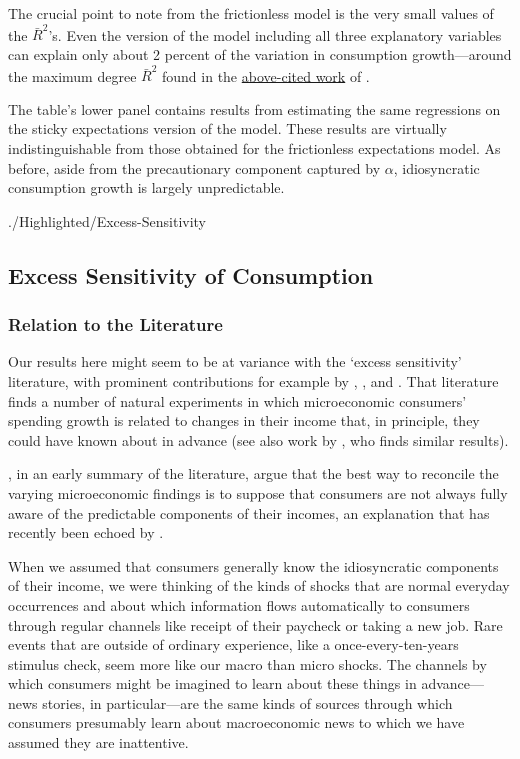 \documentclass[titlepage]{./econtex}
\begin{document}
The crucial point to note from the frictionless model is the very small values of the $\bar{R}^{2}$'s.  Even the version of the model including all three explanatory variables can explain only about 2 percent of the variation in consumption growth---around the maximum degree $\bar{R}^{2}$ found in the \hyperlink{dynanR2}{above-cited work} of \cite{dynanHabits}.

The table's lower panel contains results from estimating the same regressions on the sticky expectations version of the model.  These results are virtually indistinguishable from those obtained for the frictionless expectations model.  As before, aside from the precautionary component captured by $\alpha$, idiosyncratic consumption growth is largely unpredictable.

\hypertarget{Excess-Sensitivity}{} \begin{verbatimwrite}{./Highlighted/Excess-Sensitivity}

\subsection{Excess Sensitivity of Consumption} \label{sec:ExcessSens}

\subsubsection{Relation to the Literature}

Our results here might seem to be at variance with the `excess sensitivity' literature, with prominent contributions for example by \cite{soulelesTaxRefunds}, \cite{jpsTax}, and \cite{psjmMPC2008}.  That literature finds a number of natural experiments in which microeconomic consumers' spending growth is related to changes in their income that, in principle, they could have known about in advance (see also work by \cite{kuengTaxnews}, who finds similar results).

\cite{BrowningColladoAER}, in an early summary of the literature, argue that the best way to reconcile the varying microeconomic findings is to suppose that consumers are not always fully aware of the predictable components of their incomes, an explanation that has recently been echoed by \cite{parker25million}.

When we assumed that consumers generally know the idiosyncratic components of their income, we were thinking of the kinds of shocks that are normal everyday occurrences and about which information flows automatically to consumers through regular channels like receipt of their paycheck or taking a new job.  Rare events that are outside of ordinary experience, like a once-every-ten-years stimulus check, seem more like our macro than micro shocks.  The channels by which consumers might be imagined to learn about these things in advance---news stories, in particular---are the same kinds of sources through which consumers presumably learn about macroeconomic news to which we have assumed they are inattentive. 


\end{verbatimwrite}
\end{document}
